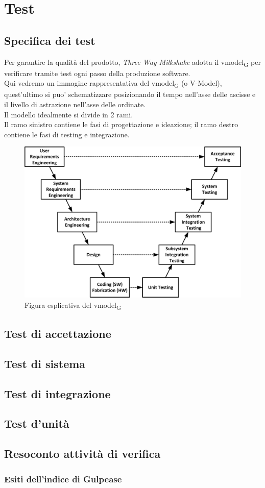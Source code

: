 \section{Test}

\subsection{Specifica dei test}

Per garantire la qualità del prodotto, \textit{Three Way Milkshake} adotta il \gls{vmodel}\textsubscript{G} per verificare tramite test ogni passo della produzione software.\\Qui vedremo un immagine rappresentativa del \gls{vmodel}\textsubscript{G} (o V-Model), quest'ultimo si puo' schematizzare posizionando il tempo nell'asse delle ascisse e il livello di astrazione nell'asse delle ordinate.\\Il modello idealmente si divide in 2 rami.\\Il ramo sinistro contiene le fasi di progettazione e ideazione; il ramo destro contiene le fasi di testing e integrazione.
\begin{figure}[h!]
	\centering
	\includegraphics[scale=0.6]{res/images/v_model.jpg}
	\caption{Figura esplicativa del \gls{vmodel}\textsubscript{G}}
\end{figure}

\subsection{Test di accettazione}

\subsection{Test di sistema}

\subsection{Test di integrazione}

\subsection{Test d'unità}

\subsection{Resoconto attività di verifica}
\subsubsection{Esiti dell'indice di Gulpease}

